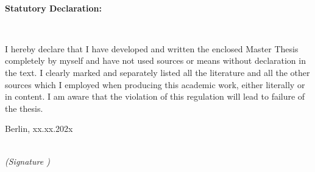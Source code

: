 \newpage

\thispagestyle{empty}

\begin{large}

\vspace*{6cm}

\

\large{ \textbf{Statutory Declaration:} }

\

\noindent
I hereby declare that I have developed and written the enclosed Master Thesis completely by myself and have not used sources or means without declaration in the text. 
I clearly marked and separately listed all the literature and all the other sources which I employed when producing this academic work, either literally or in content. 
I am aware that the violation of this regulation will lead to failure of the thesis.
\vspace{2cm}

\noindent
Berlin, xx.xx.202x

\vspace{3cm}

\hspace*{7cm}%
\dotfill\\
\hspace*{8.5cm}%
\textit{(Signature )}

\end{large}
